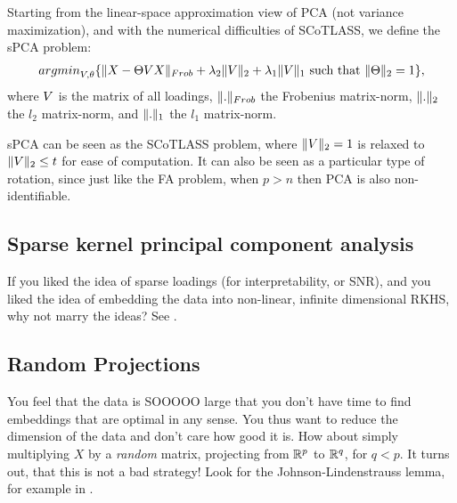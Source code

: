\documentclass[12pt,a4paper]{article}
\begin{document}
Starting from the linear-space approximation view of PCA (not variance maximization), and with the numerical difficulties of SCoTLASS, we define the sPCA problem:
\begin{align}
\label{eq:spca}
	\textstyle{\mathop{argmin}_{V,\theta}}\{ \Vert X-\Theta V X \Vert_{Frob} + \lambda_2 \Vert V \Vert_2 + \lambda_1 \Vert V \Vert_1 \text{ such that } \Vert \Theta \Vert_2=1 \},
\end{align}
where $V$ is the matrix of all loadings, $\Vert . \Vert_{Frob}$ the Frobenius matrix-norm, $\Vert . \Vert_2$ the $l_2$ matrix-norm, and $\Vert . \Vert_1$ the $l_1$ matrix-norm.

sPCA can be seen as the SCoTLASS problem, where $\Vert V \Vert_2=1$ is relaxed to $ \Vert V \Vert_2\leq t$ for ease of computation.
It can also be seen as a particular type of rotation, since just like the FA problem, when $p>n$ then PCA is also non-identifiable. 





\subsection{Sparse kernel principal component analysis}
If you liked the idea of sparse loadings (for interpretability, or SNR), and you liked the idea of embedding the data into non-linear, infinite dimensional RKHS, why not marry the ideas?
See \citet{tipping2001sparse}.



\subsection{Random Projections}
You feel that the data is SOOOOO large that you don't have time to find embeddings that are optimal in any sense. 
You thus want to reduce the dimension of the data and don't care how good it is. 
How about simply multiplying $X$ by a \emph{random} matrix, projecting from $\mathbb{R}^p$ to $\mathbb{R}^q$, for $q<p$.
It turns out, that this is not a bad strategy!
Look for the Johnson-Lindenstrauss lemma, for example in \citet{mohri2012foundations}.


\newpage


\end{document}
